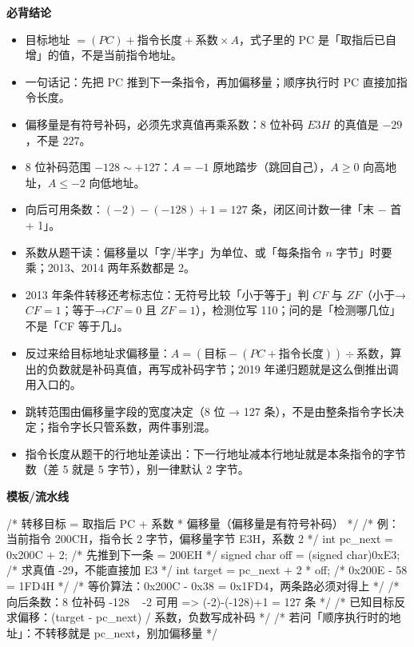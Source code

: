 \documentclass[10pt,a4paper]{ctexart}
\begin{document}


\textbf{必背结论}

\begin{itemize}

\item 目标地址 $=(PC)+\text{指令长度}+\text{系数}\times A$，式子里的 PC 是「取指后已自增」的值，不是当前指令地址。

\item 一句话记：先把 PC 推到下一条指令，再加偏移量；顺序执行时 PC 直接加指令长度。

\item 偏移量是有符号补码，必须先求真值再乘系数：8 位补码 $E3H$ 的真值是 $-29$，不是 $227$。

\item 8 位补码范围 $-128\sim+127$：$A=-1$ 原地踏步（跳回自己），$A\ge 0$ 向高地址，$A\le-2$ 向低地址。

\item 向后可用条数：$(-2)-(-128)+1=127$ 条，闭区间计数一律「末 − 首 + 1」。

\item 系数从题干读：偏移量以「字/半字」为单位、或「每条指令 $n$ 字节」时要乘；2013、2014 两年系数都是 2。

\item 2013 年条件转移还考标志位：无符号比较「小于等于」判 $CF$ 与 $ZF$（小于→$CF=1$；等于→$CF=0$ 且 $ZF=1$），检测位写 110；问的是「检测哪几位」不是「CF 等于几」。

\item 反过来给目标地址求偏移量：$A=(\text{目标}-(PC+\text{指令长度}))\div\text{系数}$，算出的负数就是补码真值，再写成补码字节；2019 年递归题就是这么倒推出调用入口的。

\item 跳转范围由偏移量字段的宽度决定（8 位 → 127 条），不是由整条指令字长决定；指令字长只管系数，两件事别混。

\item 指令长度从题干的行地址差读出：下一行地址减本行地址就是本条指令的字节数（差 5 就是 5 字节），别一律默认 2 字节。

\end{itemize}

\textbf{模板/流水线}

\begin{codebox}
/* 转移目标 = 取指后 PC + 系数 * 偏移量（偏移量是有符号补码） */
/* 例：当前指令 200CH，指令长 2 字节，偏移量字节 E3H，系数 2 */
int pc_next = 0x200C + 2;                  /* 先推到下一条 = 200EH */
signed char off = (signed char)0xE3;       /* 求真值 -29，不能直接加 E3 */
int target = pc_next + 2 * off;            /* 0x200E - 58 = 1FD4H */
/* 等价算法：0x200C - 0x38 = 0x1FD4，两条路必须对得上 */
/* 向后条数：8 位补码 -128 ~ -2 可用 => (-2)-(-128)+1 = 127 条 */
/* 已知目标反求偏移：(target - pc_next) / 系数，负数写成补码 */
/* 若问「顺序执行时的地址」：不转移就是 pc_next，别加偏移量 */
\end{codebox}
\end{document}
